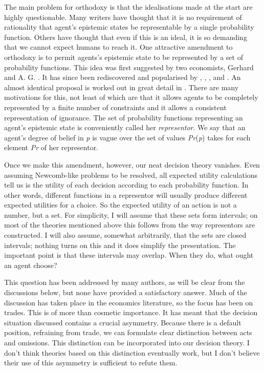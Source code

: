 The main problem for orthodoxy is that the idealisations made at the
start are highly questionable. Many writers have thought that it is no
requirement of rationality that agent's epistemic states be
representable by a single probability function. Others have thought that
even if this is an ideal, it is so demanding that we cannot expect
humans to reach it. One attractive amendment to orthodoxy is to permit
agents's epistemic state to be represented by a set of probability
functions. This idea was first suggested by two economists, Gerhard
\citet{Tintner1941} and A. G. \citet{Hart1942}. It has since been rediscovered and popularised by \citet{Smith1961}, \citet{Levi1974, Levi1980}, \citet{Williams1976, Williams1978}, \citet{Jeffrey1983} and \citet{vanFraassen1990, vanFraassen1995}. An almost identical
proposal is worked out in great detail in \citet{Walley1991}. There are many
motivations for this, not least of which are that it allows agents to be
completely represented by a finite number of constraints and it allows a
consistent representation of ignorance. The set of probability functions
representing an agent's epistemic state is conveniently called her
\emph{representor}. We say that an agent's degree of belief in \emph{p}
is vague over the set of values \emph{Pr}(\emph{p}) takes for each
element \emph{Pr} of her representor.

Once we make this amendment, however, our neat decision theory vanishes.
Even assuming Newcomb-like problems to be resolved, all expected utility
calculations tell us is the utility of each decision according to each
probability function. In other words, different functions in a
representor will usually produce different expected utilities for a
choice. So the expected utility of an action is not a number, but a set.
For simplicity, I will assume that these sets form intervals; on most of
the theories mentioned above this follows from the way representors are
constructed. I will also assume, somewhat arbitrarily, that the sets are
closed intervals; nothing turns on this and it does simplify the
presentation. The important point is that these intervals may overlap.
When they do, what ought an agent choose?

This question has been addressed by many authors, as will be clear from
the discussions below, but none have provided a satisfactory answer.
Much of the discussion has taken place in the economics literature, so
the focus has been on trades. This is of more than cosmetic importance.
It has meant that the decision situation discussed contains a crucial
asymmetry. Because there is a default position, refraining from trade,
we can formulate clear distinction between acts and omissions. This
distinction can be incorporated into our decision theory. I don't think
theories based on this distinction eventually work, but I don't believe
their use of this asymmetry is sufficient to refute them.

